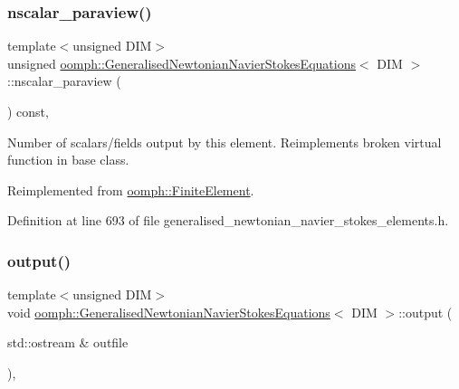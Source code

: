 \subsubsection{\texorpdfstring{nscalar\+\_\+paraview()}{nscalar\_paraview()}}
{\footnotesize\ttfamily template$<$unsigned D\+IM$>$ \\
unsigned \hyperlink{classoomph_1_1GeneralisedNewtonianNavierStokesEquations}{oomph\+::\+Generalised\+Newtonian\+Navier\+Stokes\+Equations}$<$ D\+IM $>$\+::nscalar\+\_\+paraview (\begin{DoxyParamCaption}{ }\end{DoxyParamCaption}) const\hspace{0.3cm}{\ttfamily [inline]}, {\ttfamily [virtual]}}



Number of scalars/fields output by this element. Reimplements broken virtual function in base class. 



Reimplemented from \hyperlink{classoomph_1_1FiniteElement_a865e2e5586552ba80babdbe26a77fe8c}{oomph\+::\+Finite\+Element}.



Definition at line 693 of file generalised\+\_\+newtonian\+\_\+navier\+\_\+stokes\+\_\+elements.\+h.

\mbox{\label{classoomph_1_1GeneralisedNewtonianNavierStokesEquations_a1f84ecb8a91df11868349a1e826074bd}} 
\subsubsection{\texorpdfstring{output()}{output()}\hspace{0.1cm}{\footnotesize\ttfamily [1/4]}}
{\footnotesize\ttfamily template$<$unsigned D\+IM$>$ \\
void \hyperlink{classoomph_1_1GeneralisedNewtonianNavierStokesEquations}{oomph\+::\+Generalised\+Newtonian\+Navier\+Stokes\+Equations}$<$ D\+IM $>$\+::output (\begin{DoxyParamCaption}\item[{std\+::ostream \&}]{outfile }\end{DoxyParamCaption})\hspace{0.3cm}{\ttfamily [inline]}, {\ttfamily [virtual]}}



